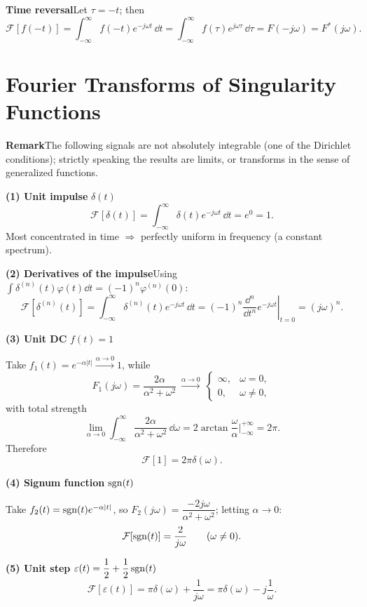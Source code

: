 \textbf{Time reversal}\quad Let $\tau=-t$; then
\[
    \mathcal{F}[f(-t)]=\int_{-\infty}^{\infty}f(-t)e^{-j\omega t}\,\dd t
    =\int_{-\infty}^{\infty}f(\tau)e^{j\omega\tau}\,\dd\tau
    =F(-j\omega)=F^{*}(j\omega).
\]

\section{Fourier Transforms of Singularity Functions}

\begin{note}
\textbf{Remark}\quad The following signals are not absolutely integrable (one
of the Dirichlet conditions); strictly speaking the results are limits, or
transforms in the sense of generalized functions.
\end{note}

\textbf{(1) Unit impulse} $\delta(t)$
\[
    \mathcal{F}[\delta(t)]=\int_{-\infty}^{\infty}\delta(t)e^{-j\omega t}\,\dd t
    =e^{0}=1 .
\]
Most concentrated in time $\Rightarrow$ perfectly uniform in frequency (a
constant spectrum).

\textbf{(2) Derivatives of the impulse}\quad Using
$\displaystyle\int\delta^{(n)}(t)\varphi(t)\dd t=(-1)^{n}\varphi^{(n)}(0)$:
\[
    \mathcal{F}[\delta^{(n)}(t)]
    =\int_{-\infty}^{\infty}\delta^{(n)}(t)e^{-j\omega t}\,\dd t
    =(-1)^{n}\left.\frac{\dd^{n}}{\dd t^{n}}e^{-j\omega t}\right|_{t=0}
    =(j\omega)^{n}.
\]

\textbf{(3) Unit DC} $f(t)=1$

Take $f_1(t)=e^{-\alpha|t|}\xrightarrow{\alpha\to0}1$, while
\[
    F_1(j\omega)=\frac{2\alpha}{\alpha^{2}+\omega^{2}}
    \ \xrightarrow{\alpha\to0}\
    \begin{cases}
        \infty, & \omega=0,\\
        0, & \omega\neq 0,
    \end{cases}
\]
with total strength
\[
    \lim_{\alpha\to0}\int_{-\infty}^{\infty}\frac{2\alpha}{\alpha^{2}+\omega^{2}}\,\dd\omega
    =2\arctan\frac{\omega}{\alpha}\Big|_{-\infty}^{+\infty}=2\pi .
\]
Therefore
\[
    \mathcal{F}[1]=2\pi\delta(\omega).
\]

\textbf{(4) Signum function} $\operatorname{sgn}(t)$

Take $f_2(t)=\operatorname{sgn}(t)e^{-\alpha|t|}$, so
$F_2(j\omega)=\dfrac{-2j\omega}{\alpha^{2}+\omega^{2}}$; letting $\alpha\to0$:
\[
    \mathcal{F}[\operatorname{sgn}(t)]=\frac{2}{j\omega}\qquad(\omega\neq 0).
\]

\textbf{(5) Unit step}\quad
$\varepsilon(t)=\dfrac{1}{2}+\dfrac{1}{2}\operatorname{sgn}(t)$
\[
    \mathcal{F}[\varepsilon(t)]=\pi\delta(\omega)+\frac{1}{j\omega}
    =\pi\delta(\omega)-j\frac{1}{\omega}.
\]

